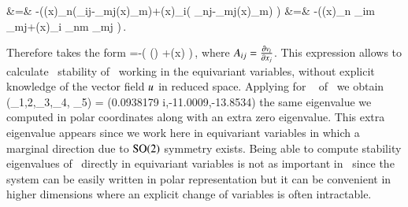 			&=& -\left(\groupTan(x)_n\left(\Lg_{ij}-\Lg_{mj}\groupTan(x)_m\right)+\groupTan(x)_i\left( \Lg_{nj}-\Lg_{mj}\groupTan(x)_m\right) \right)\continue
			&=& -\left(\groupTan(x)_n \Pperp_{im} \Lg_{mj}+\groupTan(x)_i \Pperp_{nm} \Lg_{mj} \right)\,.
\eea

Therefore  takes the form
\beq
	\mathbf{\bar{\Mvar}}=\PperpOp {}-\left(  \left(\PperpOp \Lg\right) +\groupTan(x) \otimes {} \right)\,,
	\label{eq:reqvStab}
\eeq
where $A_{ij}=\frac{\partial v_i}{\partial x_j}$. This
expression allows to calculate \reducedsp\ stability of \reqva\ working
in the equivariant variables, without explicit knowledge of
the vector field  $u$ in reduced space. Applying
 for \reqv\  of \cLe\ we obtain
\beq
(\eigExp_{1,2},\eigExp_3,\eigExp_4, \eigExp_5)
= (0.0938179  i,-11.0009,-13.8534)
\eeq
the same eigenvalue  we computed in
polar coordinates along with an extra zero eigenvalue. This extra
eigenvalue appears since we work here in equivariant variables
in which a marginal direction due to $\textrm{SO}(2)$ symmetry exists. Being
able to compute stability eigenvalues of \reqva\ directly in
equivariant variables is not as important in \cLe\ since the
system can be easily written in polar representation 
but it can be convenient in higher dimensions where an
explicit change of variables is often intractable.
